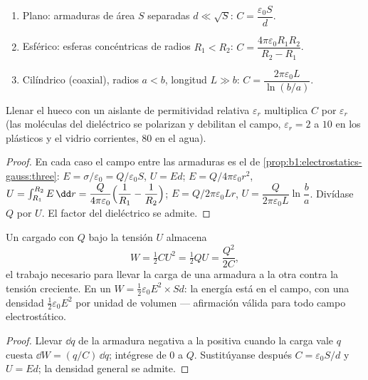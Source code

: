 \begin{proposition}\label{prop:b1:potential-capacitors:three}
\begin{enumerate}
  \item Plano: armaduras de área $S$ separadas $d \ll \sqrt S$:
        $C = \dfrac{\varepsilon_0S}{d}$.
  \item Esférico: esferas concéntricas de radios $R_1 < R_2$:
        $C = \dfrac{4\pi\varepsilon_0R_1R_2}{R_2 - R_1}$.
  \item Cilíndrico (coaxial), radios $a < b$, longitud $L \gg b$:
        $C = \dfrac{2\pi\varepsilon_0L}{\ln(b/a)}$.
\end{enumerate}
Llenar el hueco con un aislante de permitividad relativa
$\varepsilon_r$ multiplica $C$ por $\varepsilon_r$ (las moléculas del dieléctrico
se polarizan y debilitan el campo, $\varepsilon_r = 2$ a $10$ en los
plásticos y el vidrio corrientes, $80$ en el agua).
\end{proposition}

\begin{proof}
En cada caso el campo entre las armaduras es el de
\cref{prop:b1:electrostatics-gauss:three}: $E = \sigma/\varepsilon_0 = Q/\varepsilon_0S$,
$U = Ed$; $E = Q/4\pi\varepsilon_0r^2$, $U = \int_{R_1}^{R_2}E\,\dd r = \dfrac{Q}{4\pi\varepsilon_0}
\Bigl(\dfrac1{R_1} - \dfrac1{R_2}\Bigr)$; $E = Q/2\pi\varepsilon_0Lr$, $U =
\dfrac{Q}{2\pi\varepsilon_0L}\ln\dfrac ba$. Divídase $Q$ por $U$. El factor del
dieléctrico se admite.
\end{proof}

\begin{theorem}\label{thm:b1:potential-capacitors:energy}
Un  cargado con $Q$ bajo la tensión $U$ almacena
\[
W = \tfrac12 CU^2 = \tfrac12 QU = \frac{Q^2}{2C} ,
\]
el trabajo necesario para llevar la carga de una armadura a la otra
contra la tensión creciente. En un  $W = \tfrac12\varepsilon_0E^2
\times Sd$: la energía está en el campo, con una densidad
$\tfrac12\varepsilon_0E^2$ por unidad de volumen --- afirmación válida para
todo campo electrostático.
\end{theorem}

\begin{proof}
Llevar $\dd q$ de la armadura negativa a la positiva cuando la carga vale
$q$ cuesta $\dd W = (q/C)\,\dd q$; intégrese de $0$ a $Q$. Sustitúyanse
después $C = \varepsilon_0S/d$ y $U = Ed$; la densidad general se admite.
\end{proof}

